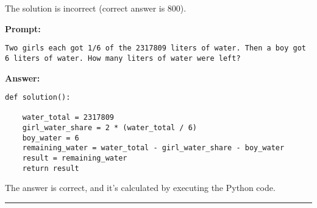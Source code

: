 	The solution is incorrect (correct answer is 800).
	\begin{displayquote}
		\textbf{Prompt:}
		\begin{Verbatim}[fontsize=\small,breaklines]
Two girls each got 1/6 of the 2317809 liters of water. Then a boy got 6 liters of water. How many liters of water were left?
	\end{Verbatim}
		\textbf{Answer:}
		\begin{Verbatim}[fontsize=\small,breaklines]
def solution():

    water_total = 2317809
    girl_water_share = 2 * (water_total / 6)
    boy_water = 6
    remaining_water = water_total - girl_water_share - boy_water
    result = remaining_water
    return result
	\end{Verbatim}
	\end{displayquote}
	The answer is correct, and it's calculated by executing the Python code.

	\noindent\rule{\textwidth}{0.4pt}

